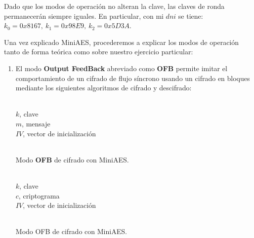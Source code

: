 	Dado que los modos de operación no alteran la clave, las claves de ronda permanecerán siempre iguales. En
	particular, con mi $dni$ se tiene: $k_0 = 0x8167,\ k_1 = 0x98E9,\ k_2 = 0x5D3A$.
	
	Una vez explicado MiniAES, procederemos a explicar los modos de operación tanto de forma teórica como sobre
	nuestro ejercicio particular:
	
	\begin{enumerate}
		\item El modo \textbf{Output FeedBack} abreviado como \textbf{OFB} permite imitar el comportamiento de
		un cifrado de flujo síncrono usando un cifrado en bloques mediante los siguientes algoritmos de cifrado
		y descifrado:
		\begin{algorithm}[H]
			\begin{algorithmic}[1]
				\REQUIRE \ \\
					\texttt{$k$}, clave\\
					\texttt{$m$}, mensaje\\
					\texttt{$IV$}, vector de inicialización\\ \
				\ENDFOR
			\end{algorithmic}
			\caption{Modo \textbf{OFB} de cifrado con MiniAES.}
			\label{EncOFB}
		\end{algorithm}
		
		\begin{algorithm}[H]
			\begin{algorithmic}[1]
				\REQUIRE \ \\
					\texttt{$k$}, clave\\
					\texttt{$c$}, criptograma\\
					\texttt{$IV$}, vector de inicialización\\ \
				\STATE{\texttt{$x = IV$}}
				\ENDFOR
			\end{algorithmic}
			\caption{Modo OFB de cifrado con MiniAES.}
			\label{DecOFB}
		\end{algorithm}
	\end{enumerate}
